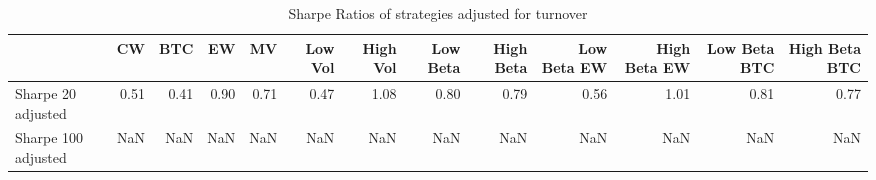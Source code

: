 \begin{table}
\centering
\caption{Sharpe Ratios of strategies adjusted for turnover}
\label{sharpe}
\begin{tabular}{lrrrrrrrrrrrr}
\toprule
{} &   CW &  BTC &   EW &   MV &  Low Vol &  High Vol &  Low Beta &  High Beta &  Low Beta EW &  High Beta EW &  Low Beta BTC &  High Beta BTC \\
\midrule
Sharpe 20 adjusted  & 0.51 & 0.41 & 0.90 & 0.71 &     0.47 &      1.08 &      0.80 &       0.79 &         0.56 &          1.01 &          0.81 &           0.77 \\
Sharpe 100 adjusted &  NaN &  NaN &  NaN &  NaN &      NaN &       NaN &       NaN &        NaN &          NaN &           NaN &           NaN &            NaN \\
\bottomrule
\end{tabular}
\end{table}
